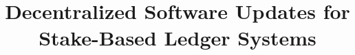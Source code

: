 \title{Decentralized Software Updates for Stake-Based Ledger Systems}
\author{}

\institute{}

%

\maketitle
